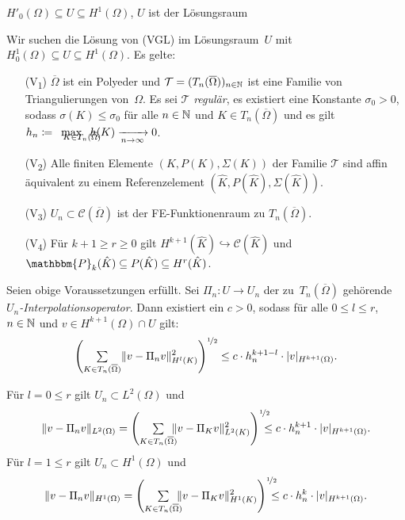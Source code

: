 \documentclass{cheat-sheet}
\newcommand{\Cont}{\mathcal{C}} %
\newcommand{\clos}[1]{\overline{#1}} %
\newcommand{\cOmega}{\clos{\Omega}} %
\newcommand{\tss}[1]{\textsubscript{#1}} %
\newcommand{\Poly}{\mathbbm{P}} %
\begin{document}

$H'_0(\Omega) \subseteq U \subseteq H^1(\Omega)$, $U$ ist der Lösungsraum

\begin{voraussetzungen}
  Wir suchen die Lösung von (VGL) im Lösungsraum~$U$ mit $H_0^1(\Omega) \subseteq U \subseteq H^1(\Omega)$.
  Es gelte:
  \begin{enumerate}[leftmargin=2.5em]
    \item[(V\tss{1})] $\cOmega$ ist ein Polyeder und $\mathcal{T} = (T_n(\cOmega))_{n \in \N}$ ist eine Familie von Triangulierungen von~$\Omega$.
    Es sei $\mathcal{T}$ \emph{regulär}, \dh{} es existiert eine Konstante $\sigma_0 > 0$, sodass $\sigma(K) \leq \sigma_0$ für alle $n \in \mathbb{N}$ und $K \in T_n(\cOmega)$ und es gilt $h_n \coloneqq \enspace \max_{\mathclap{K \in T_n(\cOmega)}} \enspace h(K) \xra[n \to \infty]{} 0$.
    \item[(V\tss{2})] Alle finiten Elemente $(K, P(K), \Sigma(K))$ der Familie $\mathcal{T}$ sind affin äquivalent zu einem Referenzelement $(\hat{K}, P(\hat{K}), \Sigma(\hat{K}))$.
    \item[(V\tss{3})] $U_n \subset \Cont(\cOmega)$ ist der FE-Funktionenraum zu $T_n(\cOmega)$.
    \item[(V\tss{4})] Für $k+1 \geq r \geq 0$ gilt $H^{k+1}(\hat{K}) \hookrightarrow \Cont(\hat{K})$ und $\Poly_k(\hat{K}) \subseteq P(\hat{K}) \subseteq H^r(\hat{K})$.
  \end{enumerate}
\end{voraussetzungen}

\begin{satz}
  Seien obige Voraussetzungen erfüllt.
  Sei $\Pi_n : U \to U_n$ der zu~$T_n(\cOmega)$ gehörende \textit{$U_n$-Interpolationsoperator}.
  Dann existiert ein $c > 0$, sodass für alle $0 \leq l \leq r$, $n \in \mathbb{N}$ und $v \in H^{k+1}(\Omega) \cap U$ gilt:
  \[
    \left( \sum_{K \in T_n(\cOmega)} \norm{v - \Pi_n v}^2_{H^l(K)} \right)^{\nicefrac{1}{2}} \leq c \cdot h_n^{k+1-l} \cdot \abs{v}_{H^{k+1}(\Omega)}.
  \]
\end{satz}

\begin{bemn}
  Für $l = 0 \leq r$ gilt $U_n \subset L^2(\Omega)$ und
  \[
    \norm{v - \Pi_n v}_{L^2(\Omega)} = \left( \sum_{K \in T_n(\cOmega)} \!\!\! \norm{v - \Pi_K v}^2_{L^2(K)} \right)^{\nicefrac{1}{2}} \!\!\!\!\! \leq c \cdot h_n^{k+1} \cdot \abs{v}_{H^{k+1}(\Omega)}.
  \]
  Für $l = 1 \leq r$ gilt $U_n \subset H^1(\Omega)$ und
  \[
    \norm{v - \Pi_n v}_{H^1(\Omega)} = \left( \sum_{K \in T_n(\cOmega)} \!\!\! \norm{v - \Pi_K v}^2_{H^1(K)} \right)^{\nicefrac{1}{2}} \!\!\!\!\! \leq c \cdot h_n^k \cdot \abs{v}_{H^{k+1}(\Omega)}.
  \]
\end{bemn}
\end{document}
